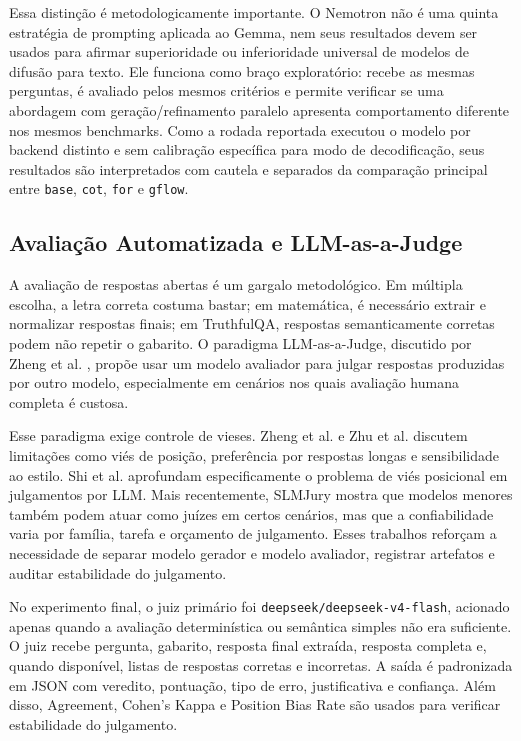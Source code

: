 \documentclass[12pt]{article}
\begin{document}
Essa distinção é metodologicamente importante. O Nemotron não é uma quinta estratégia de prompting aplicada ao Gemma, nem seus resultados devem ser usados para afirmar superioridade ou inferioridade universal de modelos de difusão para texto. Ele funciona como braço exploratório: recebe as mesmas perguntas, é avaliado pelos mesmos critérios e permite verificar se uma abordagem com geração/refinamento paralelo apresenta comportamento diferente nos mesmos benchmarks. Como a rodada reportada executou o modelo por backend distinto e sem calibração específica para modo de decodificação, seus resultados são interpretados com cautela e separados da comparação principal entre \texttt{base}, \texttt{cot}, \texttt{for} e \texttt{gflow}.

\subsection{Avaliação Automatizada e LLM-as-a-Judge}

A avaliação de respostas abertas é um gargalo metodológico. Em múltipla escolha, a letra correta costuma bastar; em matemática, é necessário extrair e normalizar respostas finais; em TruthfulQA, respostas semanticamente corretas podem não repetir o gabarito. O paradigma LLM-as-a-Judge, discutido por Zheng et al. \cite{zheng2023}, propõe usar um modelo avaliador para julgar respostas produzidas por outro modelo, especialmente em cenários nos quais avaliação humana completa é custosa.

Esse paradigma exige controle de vieses. Zheng et al. \cite{zheng2023} e Zhu et al. \cite{zhu2023} discutem limitações como viés de posição, preferência por respostas longas e sensibilidade ao estilo. Shi et al. \cite{shi2024position} aprofundam especificamente o problema de viés posicional em julgamentos por LLM. Mais recentemente, SLMJury \cite{slmjury2026} mostra que modelos menores também podem atuar como juízes em certos cenários, mas que a confiabilidade varia por família, tarefa e orçamento de julgamento. Esses trabalhos reforçam a necessidade de separar modelo gerador e modelo avaliador, registrar artefatos e auditar estabilidade do julgamento.

No experimento final, o juiz primário foi \texttt{deepseek/deepseek-v4-flash}, acionado apenas quando a avaliação determinística ou semântica simples não era suficiente. O juiz recebe pergunta, gabarito, resposta final extraída, resposta completa e, quando disponível, listas de respostas corretas e incorretas. A saída é padronizada em JSON com veredito, pontuação, tipo de erro, justificativa e confiança. Além disso, Agreement, Cohen's Kappa e Position Bias Rate são usados para verificar estabilidade do julgamento.
\end{document}
